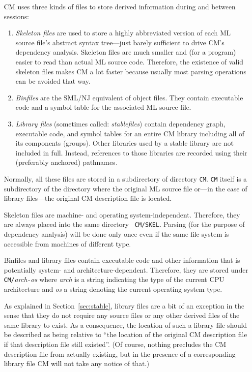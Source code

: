 \documentclass[titlepage,letterpaper]{article}
\begin{document}
CM uses three kinds of files to store derived information during and
between sessions:

\begin{enumerate}
\item {\it Skeleton files} are used to store a highly abbreviated
version of each ML source file's abstract syntax tree---just barely
sufficient to drive CM's dependency analysis.  Skeleton files are much
smaller and (for a program) easier to read than actual ML source code.
Therefore, the existence of valid skeleton files makes CM a lot faster
because usually most parsing operations can be avoided that way.
\item {\it Binfiles} are the SML/NJ equivalent of object files.  They
contain executable code and a symbol table for the associated ML
source file.
\item {\it Library files} (sometimes called: {\em stablefiles}) contain
dependency graph, executable code, and symbol tables for an entire CM
library including all of its components (groups).  Other libraries
used by a stable library are not included in full.  Instead,
references to those libraries are recorded using their (preferably
anchored) pathnames.
\end{enumerate}

Normally, all these files are stored in a subdirectory of directory
{\tt CM}. {\tt CM} itself is a subdirectory of the directory where the
original ML source file or---in the case of library files---the
original CM description file is located.

Skeleton files are machine- and operating system-independent.
Therefore, they are always placed into the same directory {\tt
CM/SKEL}. Parsing (for the purpose of dependency analysis) will be
done only once even if the same file system is accessible from
machines of different type.

Binfiles and library files contain executable code and other
information that is potentially system- and architecture-dependent.
Therefore, they are stored under {\tt CM/}{\it arch}{\tt -}{\it os}
where {\it arch} is a string indicating the type of the current
CPU architecture and {\it os} a string denoting the current operating
system type.

As explained in Section~\ref{sec:stable}, library files are a bit of
an exception in the sense that they do not require any source files or
any other derived files of the same library to exist.  As a
consequence, the location of such a library file should be described
as being relative to ``the location of the original CM description
file if that description file still existed''.  (Of course, nothing
precludes the CM description file from actually existing, but in the
presence of a corresponding library file CM will not take any notice
of that.)
\end{document}
